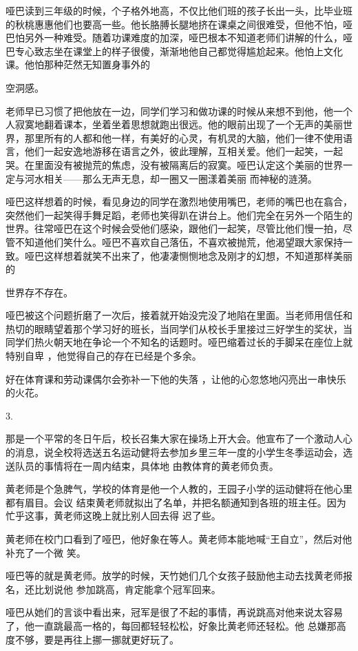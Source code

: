 \documentclass{article}
\begin{document}
哑巴读到三年级的时候，个子格外地高，不仅比他们班的孩子长出一头，比毕业班的秋桃惠惠他们也要高一些。他长胳膊长腿地挤在课桌之间很难受，但他不怕，哑巴怕另外一种难受。随着功课难度的加深，哑巴根本不知道老师们讲解的什么，哑巴专心致志坐在课堂上的样子很傻，渐渐地他自己都觉得尴尬起来。他怕上文化课。他怕那种茫然无知置身事外的

\newpage
空洞感。 

老师早已习惯了把他放在一边，同学们学习和做功课的时候从来想不到他，他一个人寂寞地翻着课本，坐着坐着思想就跑出很远。他的眼前出现了一个无声的美丽世界，那里所有的人都和他一样，有美好的心灵，有机灵的大脑，他们一律不使用语言，他们一起安逸地游移在语言之外，彼此理解，互相关爱。他们一起笑，一起哭。在里面没有被抛荒的焦虑，没有被隔离后的寂寞。哑巴认定这个美丽的世界一定与河水相关——那么无声无息，却一圈又一圈漾着美丽
而神秘的涟漪。 

哑巴这样想着的时候，看见身边的同学在激烈地使用嘴巴，老师的嘴巴也在翕合，突然他们一起笑得手舞足蹈，老师也笑得趴在讲台上。他们完全在另外一个陌生的世界。往常哑巴在这个时候会受他们感染，跟他们一起笑，尽管比他们慢一拍，尽管不知道他们笑什么。哑巴不喜欢自己落伍，不喜欢被抛荒，他渴望跟大家保持一致。哑巴这样想着就笑不出来了，他凄凄恻恻地念及刚才的幻想，不知道那样美丽的

\newpage
世界存不存在。 

哑巴被这个问题折磨了一次后，接着就开始没完没了地陷在里面。当老师用信任和热切的眼睛望着那个学习好的班长，当同学们从校长手里接过三好学生的奖状，当同学们热火朝天地在争论一个不知名的话题时。哑巴缩着过长的手脚呆在座位上就特别自卑
，他觉得自己的存在已经是个多余。 

好在体育课和劳动课偶尔会弥补一下他的失落
，让他的心忽悠地闪亮出一串快乐的火花。 


3.  

那是一个平常的冬日午后，校长召集大家在操场上开大会。他宣布了一个激动人心的消息，说全校将选送五名运动健将去参加乡里三年一度的小学生冬季运动会，选送队员的事情将在一周内结束，具体地
由教体育的黄老师负责。 

黄老师是个急脾气，学校的体育是他一个人教的，王园子小学的运动健将在他心里都有眉目。会议
\newpage
结束黄老师就拟出了名单，并把名额通知到各班的班主任。因为忙乎这事，黄老师这晚上就比别人回去得
迟了些。 

黄老师在校门口看到了哑巴，他好象在等人。黄老师本能地喊“王自立”，然后对他补充了一个微
笑。 

哑巴等的就是黄老师。放学的时候，天竹她们几个女孩子鼓励他主动去找黄老师报名，还比划说他
参加跳高，肯定能拿个冠军回来。 

哑巴从她们的言谈中看出来，冠军是很了不起的事情，再说跳高对他来说太容易了，他一直跳最高一格的，每回都轻轻松松，好象比黄老师还轻松。他
总嫌那高度不够，要是再往上挪一挪就更好玩了。 
\end{document}
